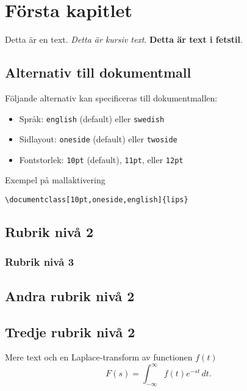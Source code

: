\documentclass[10pt,oneside,swedish]{lips}
\begin{document}
\cleardoublepage
{}\cfoot{\thepage}

\section{Första kapitlet}
Detta är en text. \emph{Detta är kursiv text}. \textbf{Detta är text i
  fetstil}.


\subsection{Alternativ till dokumentmall}
Följande alternativ kan specificeras till dokumentmallen:
\begin{itemize}
\item Språk: \texttt{english} (default) eller \texttt{swedish}
\item Sidlayout: \texttt{oneside} (default) eller \texttt{twoside}
\item Fontstorlek: \texttt{10pt} (default), \texttt{11pt}, eller \texttt{12pt}
\end{itemize}
Exempel på mallaktivering
\begin{verbatim}
\documentclass[10pt,oneside,english]{lips}
\end{verbatim}
\subsection{Rubrik nivå 2}
\label{sec:rubrik-niva-2}
\lipsum[7]

\subsubsection{Rubrik nivå 3}
\label{sec:rubrik-niva-3}
\lipsum[7]

\subsection{Andra rubrik nivå 2}
\lipsum[7]

\subsection{Tredje rubrik nivå 2}
Mere text och en Laplace-transform av functionen $f(t)$
\begin{equation}
  F(s) = \int_{-\infty}^{\infty} f(t)e^{-st}\,dt.
\end{equation}
\end{document}
